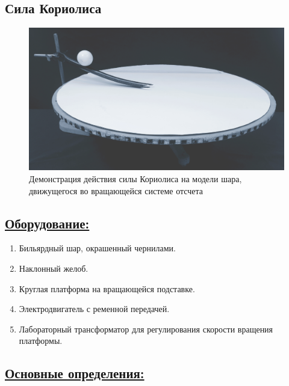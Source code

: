 \documentclass[14pt,a4paper,oneside]{extarticle}	%
\begin{document}
	

	\begin{center}
		\subsection*{Сила Кориолиса}
	\end{center}	

\begin{figure}[H] 	
	\centering 	
	\includegraphics[width=0.9\linewidth]{Coriolis-1.png}
	\caption{Демонстрация действия силы Кориолиса на модели шара, движущегося во вращающейся системе отсчета}
	\label{Coriolis-1}
\end{figure}
	
	\subsection*{\underline{Оборудование:}}

		\begin{enumerate}
			\item Бильярдный шар, окрашенный чернилами.
			\item Наклонный желоб.
			\item Круглая платформа на вращающейся подставке.
			\item Электродвигатель с ременной передачей.
			\item Лабораторный трансформатор для регулирования скорости вращения платформы.
		\end{enumerate}

\newpage
		\subsection*{\underline{Основные определения:}}
		
\end{document}
